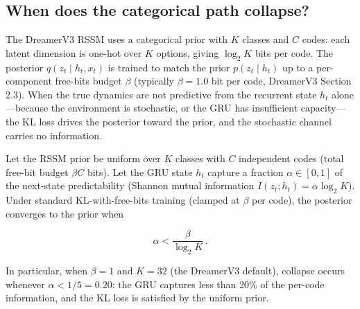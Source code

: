 %
%

\subsection{When does the categorical path collapse?}

The DreamerV3 RSSM uses a categorical prior with $K$ classes and $C$ codes:
each latent dimension is one-hot over $K$ options, giving $\log_2 K$ bits per
code. The posterior $q(z_t \mid h_t, x_t)$ is trained to match the prior
$p(z_t \mid h_t)$ up to a per-component free-bits budget $\beta$ (typically
$\beta = 1.0$ bit per code, DreamerV3 Section 2.3). When the true dynamics
are not predictive from the recurrent state $h_t$ alone---because the
environment is stochastic, or the GRU has insufficient capacity---the
KL loss drives the posterior toward the prior, and the stochastic channel
carries no information.

\begin{proposition}\label{prop:collapse}
Let the RSSM prior be uniform over $K$ classes with $C$ independent codes
(total free-bit budget $\beta C$ bits). Let the GRU state $h_t$ capture
a fraction $\alpha \in [0,1]$ of the next-state predictability
(Shannon mutual information $I(z_t ; h_t) = \alpha \log_2 K$). Under
standard KL-with-free-bits training (clamped at $\beta$ per code), the
posterior converges to the prior when

\begin{equation}\label{eq:collapse}
  \alpha < \frac{\beta}{\log_2 K} \,.
\end{equation}

In particular, when $\beta = 1$ and $K = 32$ (the DreamerV3 default),
collapse occurs whenever $\alpha < 1/5 = 0.20$: the GRU captures less
than 20\% of the per-code information, and the KL loss is satisfied by
the uniform prior.
\end{proposition}

